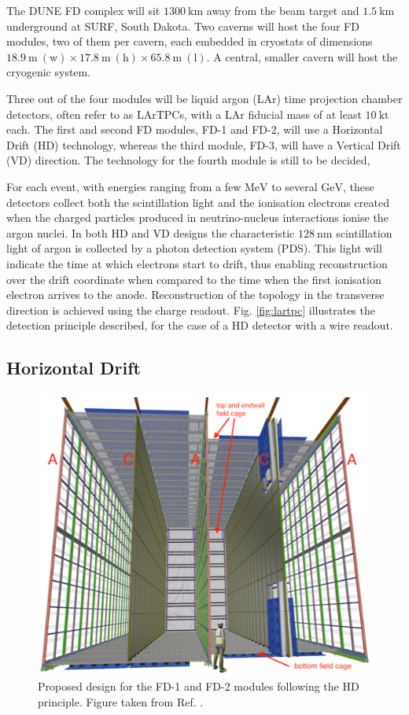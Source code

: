 The DUNE FD complex will sit $1300~\mathrm{km}$ away from the beam target and $1.5~\mathrm{km}$ underground at SURF, South Dakota. Two caverns will host the four FD modules, two of them per cavern, each embedded in cryostats of dimensions $18.9~\mathrm{m} \ (\text{w}) \times 17.8~\mathrm{m} \ (\text{h}) \times 65.8~\mathrm{m} \ (\text{l})$. A central, smaller cavern will host the cryogenic system.

Three out of the four modules will be liquid argon (LAr) time projection chamber detectors, often refer to as LArTPCs, with a LAr fiducial mass of at least $10 \ \mathrm{kt}$ each. The first and second FD modules, FD-1 and FD-2, will use a Horizontal Drift (HD) technology, whereas the third module, FD-3, will have a Vertical Drift (VD) direction. The technology for the fourth module is still to be decided, 

For each event, with energies ranging from a few $\mathrm{MeV}$ to several $\mathrm{GeV}$, these detectors collect both the scintillation light and the ionisation electrons created when the charged particles produced in neutrino-nucleus interactions ionise the argon nuclei. In both HD and VD designs the characteristic $128~\mathrm{nm}$ scintillation light of argon is collected by a photon detection system (PDS). This light will indicate the time at which electrons start to drift, thus enabling reconstruction over the drift coordinate when compared to the time when the first ionisation electron arrives to the anode. Reconstruction of the topology in the transverse direction is achieved using the charge readout. Fig. \ref{fig:lartpc} illustrates the detection principle described, for the case of a HD detector with a wire readout.

\subsection{Horizontal Drift}

\begin{figure}[t]
	\centering
	\includegraphics[width=0.65\linewidth]{Images/DUNE/FD/dune_hd}
	\caption[Proposed design for the FD-1 and FD-2 modules following the HD principle.]{Proposed design for the FD-1 and FD-2 modules following the HD principle. Figure taken from Ref. \cite{DUNE2020TDR1}.}
	\label{fig:dune_hd}
\end{figure}

